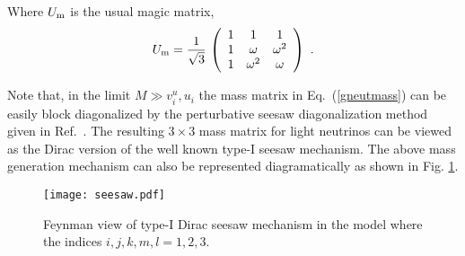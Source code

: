 \documentclass[english,10pt,aps,prd,a4paper,preprintnumbers,floatfix,nofootinbib,showpacs,superscriptaddress]{revtex4-1}
\begin{document}
  Where $U_{\rm m}$ is the usual magic matrix,
    \begin{eqnarray}
  U_{\rm m} = \dfrac{1}{\sqrt{3}} \, \left( 
\begin{array}{ccc}
1     & 1           &  1           \\
1     & \omega      &  \omega^2   \\
1     & \omega^2    &  \omega     \\  
\end{array}
\right)~.
   \label{magmat}
  \end{eqnarray}
  
  Note that, in the limit $ M \gg v^u_i, u_i$ the mass matrix in
  Eq.~(\ref{gneutmass}) can be easily block diagonalized by the
  perturbative seesaw diagonalization method given in
  Ref.~\cite{Schechter:1981cv}. The resulting $3 \times 3$ mass matrix
  for light neutrinos can be viewed as the Dirac version of the well
  known type-I seesaw mechanism. The above mass generation mechanism
  can also be represented diagramatically as shown in
  Fig. \ref{fig:feyn}. 
  \begin{figure}[!h]
 \centering
  \texttt{[image: seesaw.pdf]}
  \caption{Feynman view of type-I Dirac seesaw mechanism in the model
    where the indices $i,j,k,m,l = 1,2,3$.} 
    \label{fig:feyn}
  \end{figure}
\end{document}
